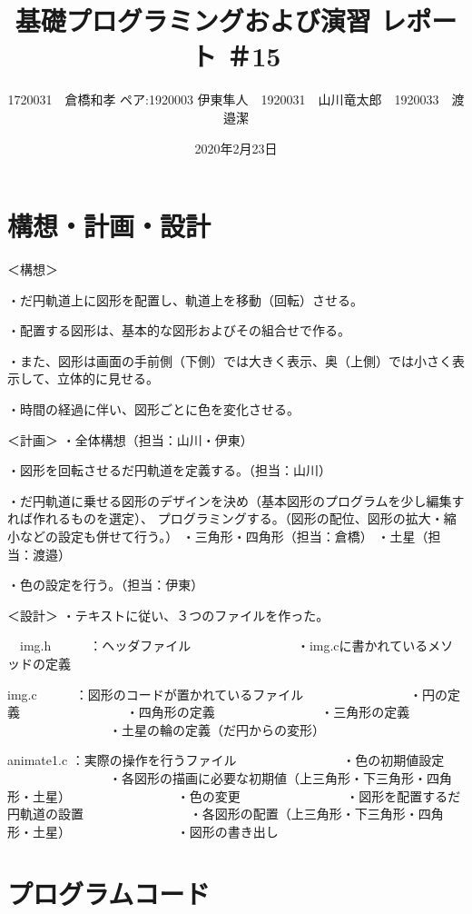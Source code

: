 \documentclass[12pt,a4j]{jarticle}
\begin{document}
\title{基礎プログラミングおよび演習 レポート ＃15}
\author{1720031　倉橋和孝 ペア:1920003 伊東隼人　1920031　山川竜太郎　1920033　渡邉潔}
\date{2020年2月23日}
\maketitle

\section{構想・計画・設計}
\begin{itemize}
＜構想＞

・だ円軌道上に図形を配置し、軌道上を移動（回転）させる。

・配置する図形は、基本的な図形およびその組合せで作る。

・また、図形は画面の手前側（下側）では大きく表示、奥（上側）では小さく表示して、立体的に見せる。

・時間の経過に伴い、図形ごとに色を変化させる。

＜計画＞
・全体構想（担当：山川・伊東）

・図形を回転させるだ円軌道を定義する。（担当：山川）

・だ円軌道に乗せる図形のデザインを決め（基本図形のプログラムを少し編集すれば作れるものを選定）、
 プログラミングする。（図形の配位、図形の拡大・縮小などの設定も併せて行う。）
    ・三角形・四角形（担当：倉橋）
    ・土星（担当：渡邉）
    
・色の設定を行う。（担当：伊東）

＜設計＞
・テキストに従い、３つのファイルを作った。

　img.h　　　：ヘッダファイル
　　　　　　　　・img.cに書かれているメソッドの定義
        
  img.c　　　：図形のコードが置かれているファイル
　　　　　　　　・円の定義
　　　　　　　　・四角形の定義
　　　　　　　　・三角形の定義
　　　　　　　　・土星の輪の定義（だ円からの変形）
        
  animate1.c ：実際の操作を行うファイル
　　　　　　　　・色の初期値設定
　　　　　　　　・各図形の描画に必要な初期値（上三角形・下三角形・四角形・土星）
　　　　　　　　・色の変更
　　　　　　　　・図形を配置するだ円軌道の設置
　　　　　　　　・各図形の配置（上三角形・下三角形・四角形・土星）
　　　　　　　　・図形の書き出し
        
\end{itemize}

\section{プログラムコード}
\end{document}
